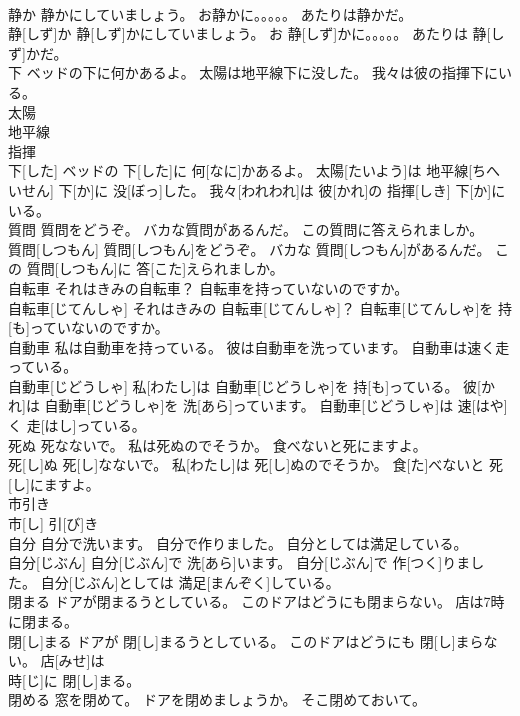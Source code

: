 \documentclass[8pt]{extreport}
\begin{document}
\begin{CJK}{UTF8}{min}
\\	静か 静かにしていましょう。 お静かに。。。。。 あたりは静かだ。	
\\	静[しず]か 静[しず]かにしていましょう。 お 静[しず]かに。。。。。 あたりは 静[しず]かだ。
\\	下 ベッドの下に何かあるよ。 太陽は地平線下に没した。 我々は彼の指揮下にいる。	
\\	太陽 
\\	地平線 
\\	指揮 
\\	下[した] ベッドの 下[した]に 何[なに]かあるよ。 太陽[たいよう]は 地平線[ちへいせん] 下[か]に 没[ぼっ]した。 我々[われわれ]は 彼[かれ]の 指揮[しき] 下[か]にいる。
\\	質問 質問をどうぞ。 バカな質問があるんだ。 この質問に答えられましか。	
\\	質問[しつもん] 質問[しつもん]をどうぞ。 バカな 質問[しつもん]があるんだ。 この 質問[しつもん]に 答[こた]えられましか。
\\	自転車 それはきみの自転車？ 自転車を持っていないのですか。	
\\	自転車[じてんしゃ] それはきみの 自転車[じてんしゃ]？ 自転車[じてんしゃ]を 持[も]っていないのですか。
\\	自動車 私は自動車を持っている。 彼は自動車を洗っています。 自動車は速く走っている。	
\\	自動車[じどうしゃ] 私[わたし]は 自動車[じどうしゃ]を 持[も]っている。 彼[かれ]は 自動車[じどうしゃ]を 洗[あら]っています。 自動車[じどうしゃ]は 速[はや]く 走[はし]っている。
\\	死ぬ 死なないで。 私は死ぬのでそうか。 食べないと死にますよ。	
\\	死[し]ぬ 死[し]なないで。 私[わたし]は 死[し]ぬのでそうか。 食[た]べないと 死[し]にますよ。
\\	市引き	
\\	市[し] 引[び]き
\\	自分 自分で洗います。 自分で作りました。 自分としては満足している。	
\\	自分[じぶん] 自分[じぶん]で 洗[あら]います。 自分[じぶん]で 作[つく]りました。 自分[じぶん]としては 満足[まんぞく]している。
\\	閉まる ドアが閉まるうとしている。 このドアはどうにも閉まらない。 店は7時に閉まる。	
\\	閉[し]まる ドアが 閉[し]まるうとしている。 このドアはどうにも 閉[し]まらない。 店[みせ]は 
\\	時[じ]に 閉[し]まる。
\\	閉める 窓を閉めて。 ドアを閉めましょうか。 そこ閉めておいて。	

\end{CJK}
\end{document}
